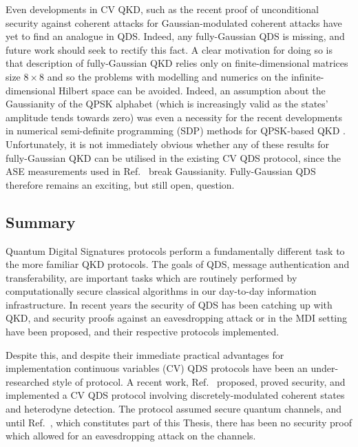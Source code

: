 Even developments in CV QKD, such as the recent proof of unconditional security against coherent attacks for Gaussian-modulated coherent attacks have yet to find an analogue in QDS. Indeed, any fully-Gaussian QDS is missing, and future work should seek to rectify this fact. A clear motivation for doing so is that description of fully-Gaussian QKD relies only on finite-dimensional matrices size $8 \times 8$ \cite{Laudenbach2017} and so the problems with modelling and numerics on the infinite-dimensional Hilbert space can be avoided. Indeed, an assumption about the Gaussianity of the QPSK alphabet (which is increasingly valid as the states' amplitude tends towards zero) was even a necessity for the recent developments in numerical semi-definite programming (SDP) methods for QPSK-based QKD \cite{Lin2019, Ghorai2019}. Unfortunately, it is not immediately obvious whether any of these results for fully-Gaussian QKD can be utilised in the existing CV QDS protocol, since the ASE measurements used in Ref.~\cite{Croal2016} break Gaussianity. Fully-Gaussian QDS therefore remains an exciting, but still open, question.


\subsection{Summary}
Quantum Digital Signatures protocols perform a fundamentally different task to the more familiar QKD protocols. The goals of QDS, message authentication and transferability, are important tasks which are routinely performed by computationally secure classical algorithms in our day-to-day information infrastructure. In recent years the security of QDS has been catching up with QKD, and security proofs against an eavesdropping attack \cite{Amiri2016, Yin2106} or in the MDI setting \cite{Puthoor2016} have been proposed, and their respective protocols implemented. 

Despite this, and despite their immediate practical advantages for implementation continuous variables (CV) QDS protocols have been an under-researched style of protocol.  A recent work, Ref.~\cite{Croal2016} proposed, proved security, and implemented a CV QDS protocol involving discretely-modulated coherent states and heterodyne detection. The protocol assumed secure quantum channels, and until Ref.~\cite{Thornton2019}, which constitutes part of this Thesis, there has been no security proof which allowed for an eavesdropping attack on the channels.

